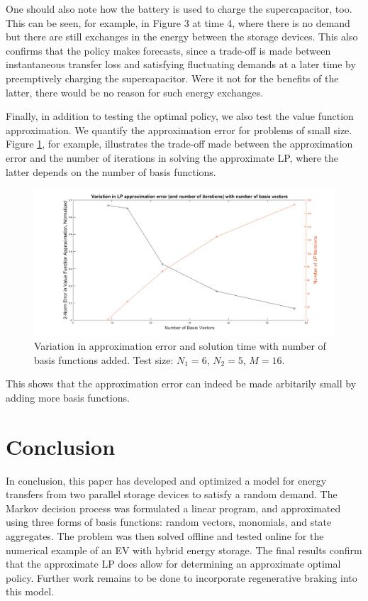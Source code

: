 \documentclass[conference]{IEEEtran}
\begin{document}
One should also note how the battery is used to charge the supercapacitor, too. This can be seen, for example, in Figure 3 at time 4, where there is no demand but there are still exchanges in the energy between the storage devices. This also confirms that the policy makes forecasts, since a trade-off is made between instantaneous transfer loss and satisfying fluctuating demands at a later time by preemptively charging the supercapacitor. Were it not for the benefits of the latter, there would be no reason for such energy exchanges.

Finally, in addition to testing the optimal policy, we also test the value function approximation. We quantify the approximation error for problems of small size. Figure \ref{fig:ApproxVsIter}, for example, illustrates the trade-off made between the approximation error and the number of iterations in solving the approximate LP, where the latter depends on the number of basis functions. \begin{figure}[tbp]
\centerline{\includegraphics[scale=0.25]{ApproxErr_vs_NumIter.png}}
\caption{Variation in approximation error and solution time with number of basis functions added. Test size: $N_{1}=6$, $N_{2}=5$, $M=16$.}
\label{fig:ApproxVsIter}
\end{figure} This shows that the approximation error can indeed be made arbitarily small by adding more basis functions.



\section{Conclusion}
In conclusion, this paper has developed and optimized a model for energy transfers from two parallel storage devices to satisfy a random demand. The Markov decision process was formulated a linear program, and approximated using three forms of basis functions: random vectors, monomials, and state aggregates. The problem was then solved offline and tested online for the numerical example of an EV with hybrid energy storage. The final results confirm that the approximate LP does allow for determining an approximate optimal policy. Further work remains to be done to incorporate regenerative braking into this model.



\end{document}
